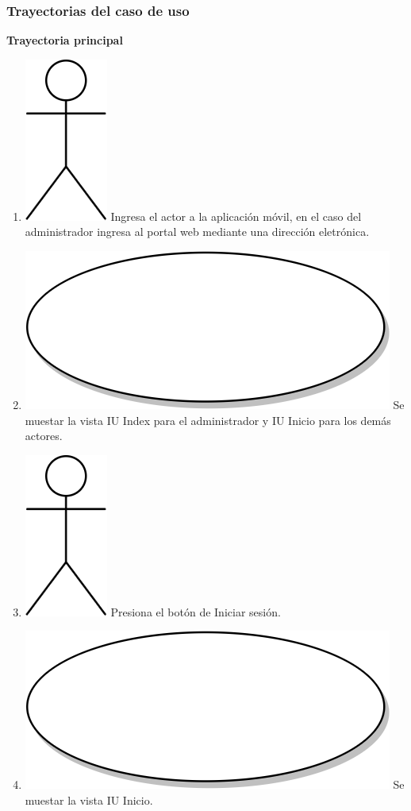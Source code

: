 \subsubsection{Trayectorias del caso de uso}
\textbf{Trayectoria principal}
\begin{enumerate}
  \item {\includegraphics[scale=.1]{Capitulo3/img/actor.png} Ingresa el actor a la aplicación móvil, en el caso del administrador ingresa al portal web mediante una dirección eletrónica.}
  \item {\includegraphics[scale=.05]{Capitulo3/img/proceso.png} Se muestar la vista IU Index para el administrador y IU Inicio para los demás actores.}
  \item {\includegraphics[scale=.1]{Capitulo3/img/actor.png} Presiona el botón de Iniciar sesión.}
  \item {\includegraphics[scale=.05]{Capitulo3/img/proceso.png} Se muestar la vista IU Inicio.}

\end{enumerate}
